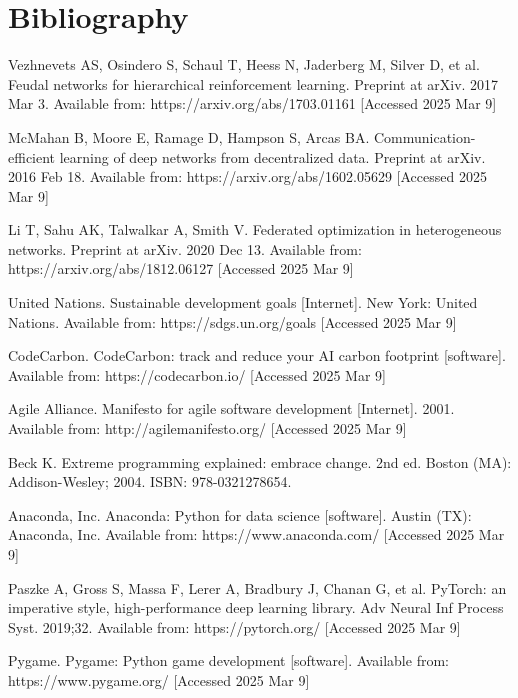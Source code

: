 \documentclass[12pt,a4paper,twoside,openany]{book}
\begin{document}
\chapter{Bibliography}
\renewcommand{\bibname}{}
\begin{thebibliography}{99}

Vezhnevets AS, Osindero S, Schaul T, Heess N, Jaderberg M, Silver D, et al. Feudal networks for hierarchical reinforcement learning. Preprint at arXiv. 2017 Mar 3. Available from: https://arxiv.org/abs/1703.01161 [Accessed 2025 Mar 9]

McMahan B, Moore E, Ramage D, Hampson S, Arcas BA. Communication-efficient learning of deep networks from decentralized data. Preprint at arXiv. 2016 Feb 18. Available from: https://arxiv.org/abs/1602.05629 [Accessed 2025 Mar 9]

Li T, Sahu AK, Talwalkar A, Smith V. Federated optimization in heterogeneous networks. Preprint at arXiv. 2020 Dec 13. Available from: https://arxiv.org/abs/1812.06127 [Accessed 2025 Mar 9]

United Nations. Sustainable development goals [Internet]. New York: United Nations. Available from: https://sdgs.un.org/goals [Accessed 2025 Mar 9]

CodeCarbon. CodeCarbon: track and reduce your AI carbon footprint [software]. Available from: https://codecarbon.io/ [Accessed 2025 Mar 9]

Agile Alliance. Manifesto for agile software development [Internet]. 2001. Available from: http://agilemanifesto.org/ [Accessed 2025 Mar 9]

Beck K. Extreme programming explained: embrace change. 2nd ed. Boston (MA): Addison-Wesley; 2004. ISBN: 978-0321278654.

Anaconda, Inc. Anaconda: Python for data science [software]. Austin (TX): Anaconda, Inc. Available from: https://www.anaconda.com/ [Accessed 2025 Mar 9]

Paszke A, Gross S, Massa F, Lerer A, Bradbury J, Chanan G, et al. PyTorch: an imperative style, high-performance deep learning library. Adv Neural Inf Process Syst. 2019;32. Available from: https://pytorch.org/ [Accessed 2025 Mar 9]

Pygame. Pygame: Python game development [software]. Available from: https://www.pygame.org/ [Accessed 2025 Mar 9]


\end{thebibliography}
\end{document}
